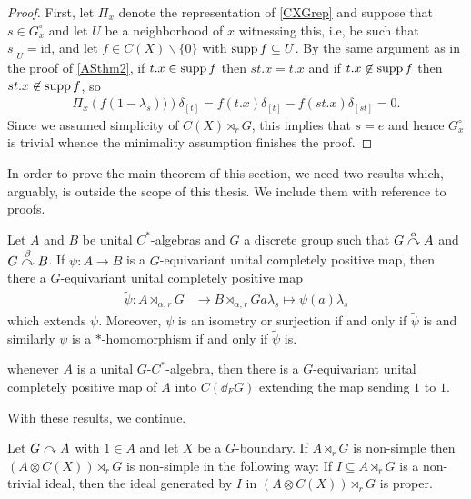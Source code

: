 \begin{proof}
	First, let $\Pi_x$ denote the representation of \cref{CXGrep} and suppose that $s \in G_x^\circ$ and let $U$ be a neighborhood of $x$ witnessing this, i.e, be such that $s|_U = \mathrm{id}$, and let $f \in C(X)\backslash\{0\}$ with $\operatorname{supp} f \subseteq U$. By the same argument as in the proof of \cref{ASthm2}, if $t.x \in \operatorname{supp} f$ then $st.x=t.x$ and if $t.x \not \in \operatorname{supp} f$ then $st.x \not \in \operatorname{supp} f$, so
	\begin{align*}
		\Pi_x\left(f ( 1-\lambda_s)) \right) \delta_{[t]} = f(t.x) \delta_{[t]} -f(st.x) \delta_{[st]}  = 0.
	\end{align*}
	Since we assumed simplicity of $C(X) \rtimes_r G$, this implies that $s = e$ and hence $G_x^\circ $ is trivial whence the minimality assumption finishes the proof.
\end{proof}
	In order to prove the main theorem of this section, we need two results which, arguably, is outside the scope of this thesis. We include them with reference to proofs.
\begin{lemma}
	Let $A$ and $B$ be unital $C^*$-algebras and $G$ a discrete group such that $G \stackrel{\alpha}{\curvearrowright} A$ and $G \stackrel{\beta}{\curvearrowright} B$. If $\psi \colon A \to B$ is a $G$-equivariant unital completely positive map, then there a $G$-equivariant unital completely positive map 
	\begin{align*}
		\tilde \psi \colon A \rtimes_{\alpha,r}  G &\to B \rtimes_{\alpha,r} G
		a \lambda_s \mapsto \psi(a) \lambda_s 
	\end{align*}
	which extends $\psi$. Moreover, $\psi$ is an isometry or surjection if and only if $\tilde \psi$ is and similarly $\psi$ is a $*$-homomorphism if and only if $\tilde \psi$ is.
	\label{hamanalift}
\end{lemma}
\begin{lemma}
	whenever $A$ is a unital $G$-$C^*$-algebra, then there is a $G$-equivariant unital completely positive map of $A$ into $C(\dd_F G)$ extending the map sending $1$ to $1$. 
	\label{1lifthamana}
\end{lemma}
With these results, we continue.
\begin{proposition}
	Let $G \stackrel{}{\curvearrowright} A$ with $1 \in A$ and let $X$ be a $G$-boundary. If $A \rtimes_r G$ is non-simple then $(A \otimes C(X))\rtimes_r G$ is non-simple in the following way: If $I \subseteq A \rtimes_r G$ is a non-trivial ideal, then the ideal generated by $I$ in $(A \otimes C(X))\rtimes_r G$ is proper.
	\label{ozawprop17}
\end{proposition}
